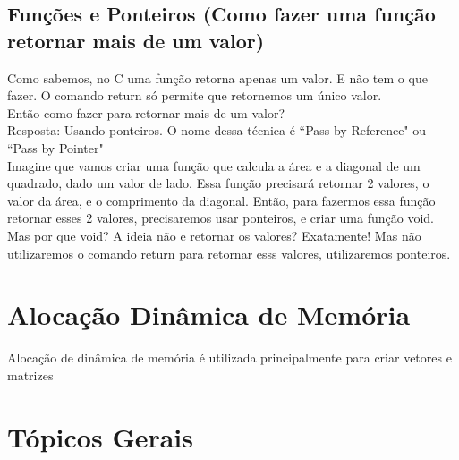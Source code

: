 \documentclass{article}
\begin{document}
\subsection{Funções e Ponteiros (Como fazer uma função retornar mais de um valor)}
Como sabemos, no C uma função retorna apenas um valor. E não tem o que fazer. O comando return só permite que retornemos um único valor.
\\[3pt]
Então como fazer para retornar mais de um valor?
\\[3pt]
Resposta: Usando ponteiros. O nome dessa técnica é ``Pass by Reference" ou ``Pass by Pointer"
\\[3pt]
Imagine que vamos criar uma função que calcula a área e a diagonal de um quadrado, dado um valor de lado. Essa função precisará retornar 2 valores, o valor da área, e o comprimento da diagonal. Então, para fazermos essa função retornar esses 2 valores, precisaremos usar ponteiros, e criar uma função void.
\\[3pt]
Mas por que void? A ideia não e retornar os valores? Exatamente! Mas não utilizaremos o comando return para retornar esss valores, utilizaremos ponteiros. 

\section{Alocação Dinâmica de Memória}
Alocação de dinâmica de memória é utilizada principalmente para criar vetores e matrizes

\section{Tópicos Gerais}
\end{document}
